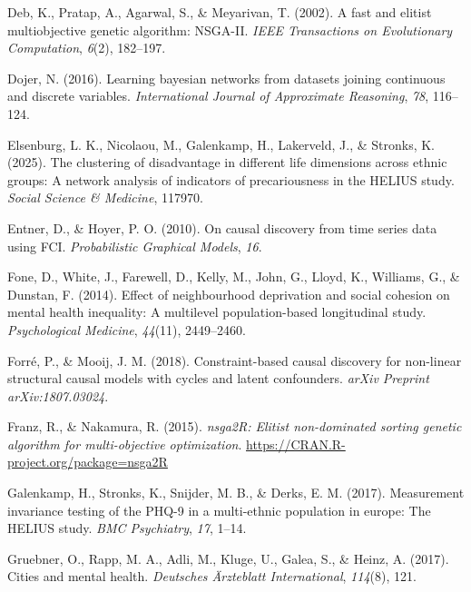 \documentclass[
]{article}
\newlength{\cslhangindent}
\newenvironment{CSLReferences}[2] %
 {\begin{list}{}{%
  \setlength{\itemindent}{0pt}
  \setlength{\leftmargin}{0pt}
  \setlength{\parsep}{0pt}
  \ifodd #1
   \setlength{\leftmargin}{\cslhangindent}
   \setlength{\itemindent}{-1\cslhangindent}
  \fi
  \setlength{\itemsep}{#2\baselineskip}}}
 {\end{list}}
\begin{document}
\label{refs}
\begin{CSLReferences}{1}{0}
Deb, K., Pratap, A., Agarwal, S., \& Meyarivan, T. (2002). A fast and
elitist multiobjective genetic algorithm: NSGA-II. \emph{IEEE
Transactions on Evolutionary Computation}, \emph{6}(2), 182--197.

Dojer, N. (2016). Learning bayesian networks from datasets joining
continuous and discrete variables. \emph{International Journal of
Approximate Reasoning}, \emph{78}, 116--124.

Elsenburg, L. K., Nicolaou, M., Galenkamp, H., Lakerveld, J., \&
Stronks, K. (2025). The clustering of disadvantage in different life
dimensions across ethnic groups: A network analysis of indicators of
precariousness in the HELIUS study. \emph{Social Science \& Medicine},
117970.

Entner, D., \& Hoyer, P. O. (2010). On causal discovery from time series
data using FCI. \emph{Probabilistic Graphical Models}, \emph{16}.

Fone, D., White, J., Farewell, D., Kelly, M., John, G., Lloyd, K.,
Williams, G., \& Dunstan, F. (2014). Effect of neighbourhood deprivation
and social cohesion on mental health inequality: A multilevel
population-based longitudinal study. \emph{Psychological Medicine},
\emph{44}(11), 2449--2460.

Forré, P., \& Mooij, J. M. (2018). Constraint-based causal discovery for
non-linear structural causal models with cycles and latent confounders.
\emph{arXiv Preprint arXiv:1807.03024}.

Franz, R., \& Nakamura, R. (2015). \emph{nsga2R: Elitist non-dominated
sorting genetic algorithm for multi-objective optimization}.
\url{https://CRAN.R-project.org/package=nsga2R}

Galenkamp, H., Stronks, K., Snijder, M. B., \& Derks, E. M. (2017).
Measurement invariance testing of the PHQ-9 in a multi-ethnic population
in europe: The HELIUS study. \emph{BMC Psychiatry}, \emph{17}, 1--14.

Gruebner, O., Rapp, M. A., Adli, M., Kluge, U., Galea, S., \& Heinz, A.
(2017). Cities and mental health. \emph{Deutsches {Ä}rzteblatt
International}, \emph{114}(8), 121.


\end{CSLReferences}
\end{document}

